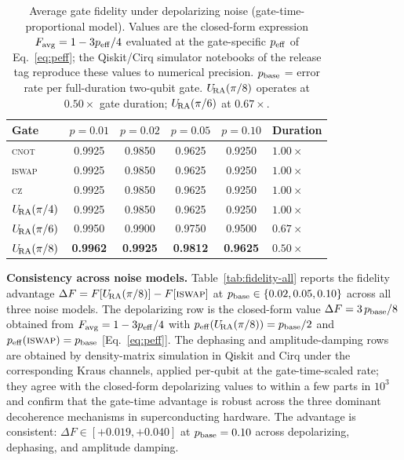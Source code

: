 \begin{table}[htbp]
\centering
\caption{Average gate fidelity under depolarizing noise (gate-time-proportional
model). Values are the closed-form expression
$F_{\rm avg} = 1 - 3 p_{\rm eff}/4$ evaluated at the gate-specific
$p_{\rm eff}$ of Eq.~\eqref{eq:peff}; the Qiskit/Cirq simulator
notebooks of the release tag reproduce these values to numerical
precision. $p_{\rm base}$ = error rate per full-duration two-qubit
gate. $U_{\!\mathrm{RA}}(\pi/8)$ operates at $0.50\times$ gate duration;
$U_{\!\mathrm{RA}}(\pi/6)$ at $0.67\times$.}
\label{tab:fidelity}
\begin{tabular}{lccccl}
\toprule
Gate & $p=0.01$ & $p=0.02$ & $p=0.05$ & $p=0.10$ & Duration \\
\midrule
\textsc{cnot}    & 0.9925 & 0.9850 & 0.9625 & 0.9250 & $1.00\times$ \\
\textsc{iswap}   & 0.9925 & 0.9850 & 0.9625 & 0.9250 & $1.00\times$ \\
\textsc{cz}      & 0.9925 & 0.9850 & 0.9625 & 0.9250 & $1.00\times$ \\
\midrule
$U_{\!\mathrm{RA}}(\pi/4)$    & 0.9925 & 0.9850 & 0.9625 & 0.9250 & $1.00\times$ \\
$U_{\!\mathrm{RA}}(\pi/6)$    & 0.9950 & 0.9900 & 0.9750 & 0.9500 & $0.67\times$ \\
$U_{\!\mathrm{RA}}(\pi/8)$    & \textbf{0.9962} & \textbf{0.9925} & \textbf{0.9812} & \textbf{0.9625} & $0.50\times$ \\
\bottomrule
\end{tabular}
\end{table}

\textbf{Consistency across noise models.}
Table~\ref{tab:fidelity-all} reports the fidelity advantage
$\Delta F = F[U_{\!\mathrm{RA}}(\pi/8)] - F[\textsc{iswap}]$ at $p_{\rm base} \in \{0.02, 0.05, 0.10\}$
across all three noise models.
The depolarizing row is the closed-form value
$\Delta F = 3\,p_{\rm base}/8$ obtained from $F_{\rm avg} = 1 - 3 p_{\rm eff}/4$
with $p_{\rm eff}(U_{\!\mathrm{RA}}(\pi/8)) = p_{\rm base}/2$ and
$p_{\rm eff}(\textsc{iswap}) = p_{\rm base}$ [Eq.~\eqref{eq:peff}].
The dephasing and amplitude-damping rows are obtained by
density-matrix simulation in Qiskit and Cirq under the corresponding
Kraus channels, applied per-qubit at the gate-time-scaled rate;
they agree with the closed-form depolarizing values to within a few
parts in $10^3$ and confirm that the gate-time advantage is robust
across the three dominant decoherence mechanisms in superconducting
hardware.
The advantage is consistent: $\Delta F \in [+0.019, +0.040]$ at
$p_{\rm base} = 0.10$ across depolarizing, dephasing, and amplitude damping.

